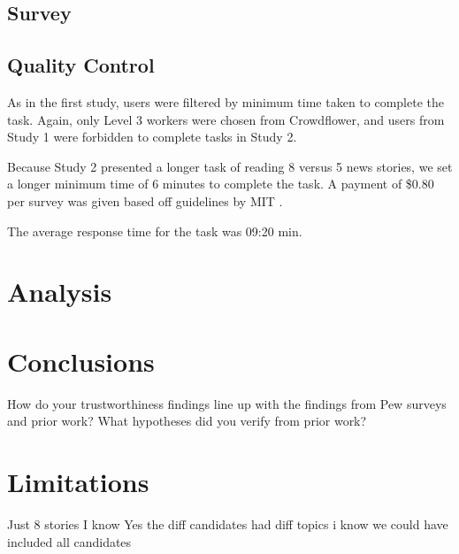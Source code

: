 
 
 
 
\subsection{Survey}

\subsection{Quality Control}

As in the first study, users were filtered by minimum time taken to complete the task. Again, only Level 3 workers were chosen from Crowdflower, and users from Study 1 were forbidden to complete tasks in Study 2. 

Because Study 2 presented a longer task of reading 8 versus 5 news stories, we set a longer minimum time of 6 minutes to complete the task. A payment of \$0.80 per survey was given based off guidelines by MIT \cite{COUHES-turk}.

The average response time for the task was 09:20 min.

\section{Analysis}



 

  


 

\section{Conclusions}

How do your trustworthiness findings line up with the findings from Pew surveys and prior work? What hypotheses did you verify from prior work?

\section{Limitations}

Just 8 stories I know
Yes the diff candidates had diff topics i know
we could have included all candidates

